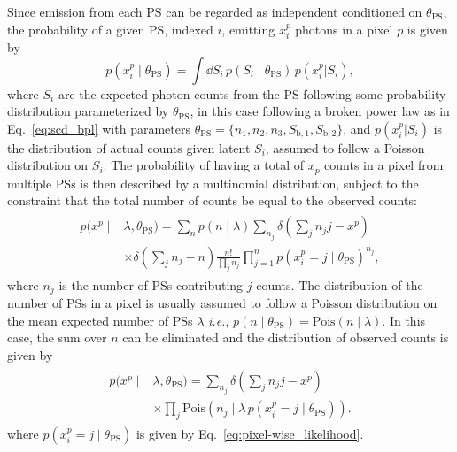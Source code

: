 \documentclass[prd,aps,10pt,nofootinbib,twocolumn,superscriptaddress,preprintnumbers,balancelastpage,longbibliography]{revtex4-1}
\begin{document}
Since emission from each PS can be regarded as independent conditioned on $\theta_\mathrm{PS}$, the probability of a given PS, indexed $i$, emitting $x^p_i$ photons in a pixel $p$ is given by
\begin{equation}
\label{eq:pixel-wise_likelihood}
p(x^p_i\mid\theta_\mathrm{PS}) = \int \dd S_i \,p(S_i\mid\theta_\mathrm{PS})\,p(x^p_i|S_i),
\end{equation}
where $S_i$ are the expected photon counts from the PS following some probability distribution parameterized by $\theta_\mathrm{PS}$, in this case following a broken power law as in Eq.~\eqref{eq:scd_bpl} with parameters $\theta_\mathrm{PS} = \{n_1, n_2, n_3, S_\mathrm{b,1}, S_\mathrm{b,2}\}$, and $p(x^p_i|S_i)$ is the distribution of actual counts given latent $S_i$, assumed to follow a Poisson distribution on $S_i$. The probability of having a total of $x_p$ counts in a pixel from multiple PSs is then described by a multinomial distribution, subject to the constraint that the total number of counts be equal to the observed counts:
\small
\begin{align}
\label{eq:pixel-wise_likelihood_multinomial}
\begin{split}
p(x^p\mid&\lambda,\theta_\mathrm{PS}) =  \sum_{n}  p\left(n \mid \lambda\right) \sum_{n_{j}} \delta\left(\sum_j n_{j}j - x^p\right) \\ 
&\times \delta\left(\sum_j n_{j} - n\right) \frac{n!}{\prod_j n_{j} }\prod_{j=1}^{n} p(x^p_i = j\mid\theta_\mathrm{PS})  ^ {n_{j}},
\end{split}
\end{align}
\normalsize
where $n_j$ is the number of PSs contributing $j$ counts. The distribution of the number of PSs in a pixel is usually assumed to follow a Poisson distribution on the mean expected number of PSs $\lambda$ \emph{i.e.}, $p(n\mid\theta_\mathrm{PS}) = \mathrm{Pois}(n\mid\lambda)$. In this case, the sum over $n$ can be eliminated and the distribution of observed counts is given by
\begin{align}
\label{eq:pixel-wise_likelihood_poisson}
\begin{split}
p(x^p\mid&\lambda, \theta_\mathrm{PS}) = \sum_{n_j} \delta\left(\sum_j n_{j}j - x^p\right) \\ & \times \prod_j \mathrm{Pois}\left(n_{j}\mid\lambda \, p(x^p_i = j\mid\theta_\mathrm{PS})\right).
\end{split}
\end{align}
where $p(x^p_i = j\mid\theta_\mathrm{PS})$ is given by Eq.~\eqref{eq:pixel-wise_likelihood}. 
\end{document}
